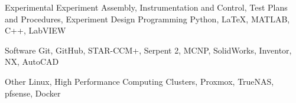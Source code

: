 
\begin{cvskills}
  \cvskill
    {Experimental}
    {Experiment Assembly, Instrumentation and Control, Test Plans and Procedures, Experiment Design}
  \cvskill
    {Programming} %
    {Python, \LaTeX, MATLAB, C++, LabVIEW} %

  \cvskill
    {Software} %
    {Git, GitHub, STAR-CCM+, Serpent 2, MCNP, SolidWorks, Inventor, NX, AutoCAD} %
    
  \cvskill
    {Other} %
    {Linux, High Performance Computing Clusters, Proxmox, TrueNAS, pfsense, Docker} %
\end{cvskills}
